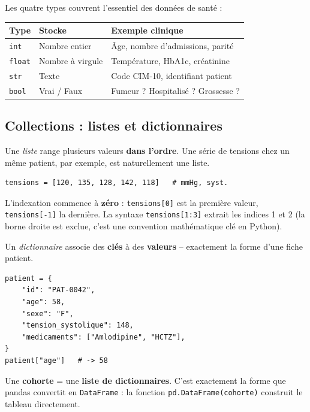 \documentclass[11pt,a4paper]{article}
\begin{document}
Les quatre types couvrent l'essentiel des donn\'ees de sant\'e :

\begin{table}[h]
\centering
\begin{tabular}{lll}
\toprule
\bfseries Type & \bfseries Stocke & \bfseries Exemple clinique \\
\midrule
\texttt{int}   & Nombre entier         & \^Age, nombre d'admissions, parit\'e \\
\texttt{float} & Nombre \`a virgule    & Temp\'erature, HbA1c, cr\'eatinine \\
\texttt{str}   & Texte                 & Code CIM-10, identifiant patient \\
\texttt{bool}  & Vrai / Faux           & Fumeur ? Hospitalis\'e ? Grossesse ? \\
\bottomrule
\end{tabular}
\end{table}

\subsection{Collections : listes et dictionnaires}

Une \emph{liste} range plusieurs valeurs \textbf{dans l'ordre}. Une
s\'erie de tensions chez un m\^eme patient, par exemple, est naturellement
une liste.

\begin{verbatim}
tensions = [120, 135, 128, 142, 118]   # mmHg, syst.
\end{verbatim}

L'indexation commence \`a \textbf{z\'ero} : \texttt{tensions[0]} est la
premi\`ere valeur, \texttt{tensions[-1]} la derni\`ere. La syntaxe
\texttt{tensions[1:3]} extrait les indices 1 et 2 (la borne droite est
exclue, c'est une convention math\'ematique cl\'e en Python).

Un \emph{dictionnaire} associe des \textbf{cl\'es} \`a des \textbf{valeurs}
-- exactement la forme d'une fiche patient.

\begin{verbatim}
patient = {
    "id": "PAT-0042",
    "age": 58,
    "sexe": "F",
    "tension_systolique": 148,
    "medicaments": ["Amlodipine", "HCTZ"],
}
patient["age"]   # -> 58
\end{verbatim}

\begin{notebox}
Une \textbf{cohorte} = une \textbf{liste de dictionnaires}. C'est
exactement la forme que pandas convertit en \texttt{DataFrame} : la
fonction \texttt{pd.DataFrame(cohorte)} construit le tableau directement.
\end{notebox}
\end{document}
